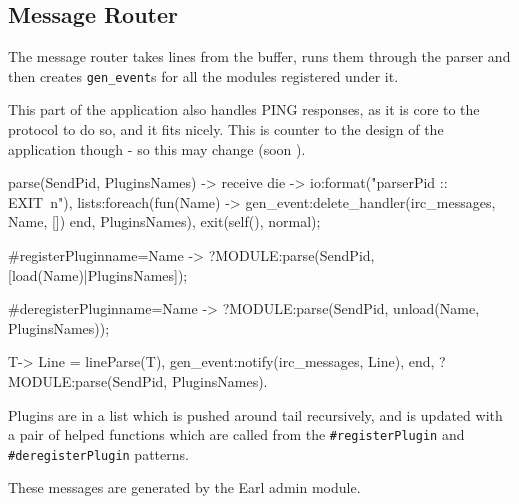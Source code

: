 \documentclass[12pt]{article}
\begin{document}
\subsection*{Message Router}

The message router takes lines from the buffer, runs them through the parser 
and then creates \texttt{gen_event}s for all the modules registered under it.

This part of the application also handles PING responses, as it is core to the
protocol to do so, and it fits nicely. This is counter to the design of the 
application though - so this may change (soon \tm).

parse(SendPid, PluginsNames) ->
    receive
	die ->
	    io:format("parserPid :: EXIT~n"),
	    lists:foreach(fun(Name) -> gen_event:delete_handler(irc_messages, Name, []) end, PluginsNames),
	    exit(self(), normal);

	#registerPlugin{name=Name} ->
	    ?MODULE:parse(SendPid, [load(Name)|PluginsNames]);

	#deregisterPlugin{name=Name} ->
	    ?MODULE:parse(SendPid, unload(Name, PluginsNames));

	T->
	    Line = lineParse(T),
	    gen_event:notify(irc_messages, Line),
	    end,
    ?MODULE:parse(SendPid, PluginsNames).

Plugins are in a list which is pushed around tail recursively, and is updated
with a pair of helped functions which are called from the
\texttt{#registerPlugin} and \texttt{#deregisterPlugin} patterns.

These messages are generated by the Earl admin module.
\end{document}
